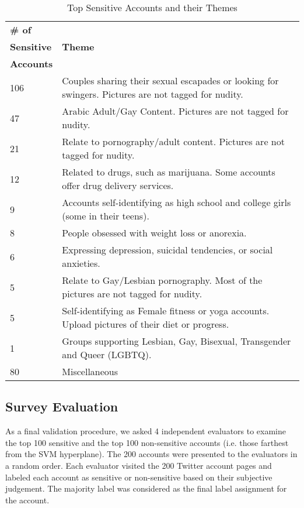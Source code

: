 \documentclass[conference]{IEEEtran}
\begin{document}
\begin{table}[thb]
\small
\begin{center}
\caption{Top Sensitive Accounts and their Themes}
\label{tab:sensitiveaccounts}
\begin{tabular}{| p{1.5cm}| p{6cm} |}
\hline
\textbf{\# of} & \multirow{3}{*}{\textbf{Theme}}\\
\textbf{Sensitive} & \\
\textbf{Accounts} & \\
\hline
106 & Couples sharing their sexual escapades or looking for swingers. Pictures are not tagged for nudity.\\
\hline
47 & Arabic Adult/Gay Content. Pictures are not tagged for nudity.\\
 \hline
 21 & Relate to pornography/adult content. Pictures are not tagged for nudity. \\
 \hline
 12 & Related to drugs, such as marijuana. Some accounts offer drug delivery services. \\
 \hline
 9 & Accounts self-identifying as high school and college girls (some in their teens).\\
 \hline
 8 & People obsessed with weight loss or anorexia.\\
 \hline
 6 & Expressing depression, suicidal tendencies, or social anxieties. \\
 \hline
 5 & Relate to Gay/Lesbian pornography. Most of the pictures are not tagged for nudity.\\
 \hline
 5 & Self-identifying as Female fitness or yoga accounts. Upload pictures of their diet or progress.\\
 \hline
 1 & Groups supporting Lesbian, Gay, Bisexual, Transgender and Queer (LGBTQ).\\
 \hline
80 & Miscellaneous\\
 \hline
\end{tabular}
\end{center}
\end{table}

\subsection{Survey Evaluation}

As a final validation procedure, we asked 4 independent evaluators to examine the top 100 sensitive and the top 100 non-sensitive accounts (i.e. those farthest from the SVM hyperplane). The 200 accounts were presented to the evaluators in a random order. Each evaluator visited the 200 Twitter account pages and labeled each account as sensitive or non-sensitive based on their subjective judgement. The majority label was considered as the final label assignment for the account. 
\end{document}
